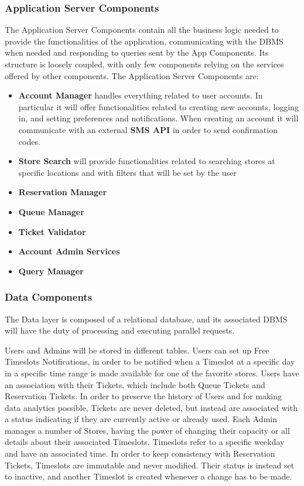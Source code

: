 \subsubsection{Application Server Components}
The Application Server Components contain all the business logic needed to provide the functionalities of the application, communicating with the DBMS when needed and responding to queries sent by the App Components. Its structure is loosely coupled, with only few components relying on the services offered by other components.
The Application Server Components are:
\begin{itemize}
    \item \textbf{Account Manager} handles everything related to user accounts. In particular it will offer functionalities related to creating new accounts, logging in, and setting preferences and notifications. When creating an account it will communicate with an external \textbf{SMS API} in order to send confirmation codes. 
    \item \textbf{Store Search} will provide functionalities related to searching stores at specific locations and with filters that will be set by the user
    \item \textbf{Reservation Manager}
    \item \textbf{Queue Manager}
    \item \textbf{Ticket Validator}
    \item \textbf{Account Admin Services}
    \item \textbf{Query Manager}
\end{itemize}

\subsubsection{Data Components}
The Data layer is composed of a relational database, and its associated DBMS will have the duty of processing and executing parallel requests.

Users and Admins will be stored in different tables.
Users can set up Free Timeslots Notifications, in order to be notified when a Timeslot at a specific day in a specific time range is made available for one of the favorite stores.
Users have an association with their Tickets, which include both Queue Tickets and Reservation Tickets.
In order to preserve the history of Users and for making data analytics possible, Tickets are never deleted, but instead are associated with a status indicating if they are currently active or already used.
Each Admin manages a number of Stores, having the power of changing their capacity or all details about their associated Timeslots.
Timeslots refer to a specific weekday and have an associated time.
In order to keep consistency with Reservation Tickets, Timeslots are immutable and never modified. Their status is instead set to inactive, and another Timeslot is created whenever a change has to be made.


